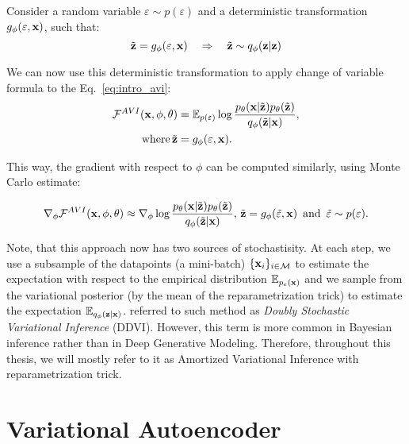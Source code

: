Consider a random variable $\varepsilon \sim p(\varepsilon)$ and a deterministic transformation $g_{\phi}(\varepsilon, {\mathbf{x}})$, such that:
\begin{equation}
    \tilde{{\mathbf{z}}} = g_{\phi}(\varepsilon, {\mathbf{x}})\quad \Rightarrow \quad  \tilde{{\mathbf{z}}} \sim q_{\phi}({\mathbf{z}}|{\mathbf{z}})
\end{equation}

We can now use this deterministic transformation to apply change of variable formula to the Eq.~\ref{eq:intro_avi}:
\begin{equation}
\begin{aligned}
     \mathcal{F}^{AVI}({\mathbf{x}}, \phi, \theta) &=  \mathbb{E}_{p(\varepsilon)}\log  \frac{p_{\theta}({\mathbf{x}}|\tilde{{\mathbf{z}}})p_{\theta}(\tilde{{\mathbf{z}}})}{q_{\phi}(\tilde{{\mathbf{z}}}|{\mathbf{x}})},\\
     \text{where}\, \tilde{{\mathbf{z}}} &= g_{\phi}(\varepsilon, {\mathbf{x}}).
\end{aligned}
\end{equation}

This way, the  gradient with respect to $\phi$ can be computed similarly, using Monte Carlo estimate:

\begin{equation}
    \nabla_{\phi}\mathcal{F}^{AVI}({\mathbf{x}}, \phi, \theta) \approx  \nabla_{\phi}\log  \frac{p_{\theta}({\mathbf{x}}|\tilde{{\mathbf{z}}})p_{\theta}(\tilde{{\mathbf{z}}})}{q_{\phi}(\tilde{{\mathbf{z}}}|{\mathbf{x}})},\, \tilde{{\mathbf{z}}} = g_{\phi}(\tilde{\varepsilon}, {\mathbf{x}})\,\text{ and }\, \tilde{\varepsilon} \sim p(\varepsilon).
\end{equation}

Note, that this approach now has two sources of stochastisity. At each step, we use a subsample of the datapoints (a mini-batch) $\{{\mathbf{x}}_i\}_{i \in \mathcal{M}}$ to estimate the expectation with respect to the empirical distribution $\mathbb{E}_{p_{e}({\mathbf{x}})}$ and we sample from the variational posterior (by the mean of the reparametrization trick) to estimate the expectation $\mathbb{E}_{q_{\phi}({\mathbf{z}}|{\mathbf{x}})}$. \citet{titsias2014doubly} referred to such method as \textit{Doubly Stochastic Variational Inference} (DDVI). 
However, this term is more common in Bayesian inference rather than in Deep Generative Modeling. Therefore, throughout this thesis, we will mostly refer to it as Amortized Variational Inference with reparametrization trick.


\section{Variational Autoencoder}\label{sec:into_deep_generative_models}


